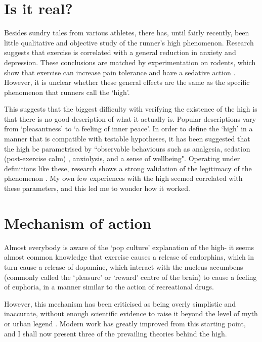 \documentclass[twocolumn]{article}
\begin{document}
\section{Is it real?}

	Besides sundry tales from various athletes, there has, until fairly recently, been little qualitative and objective study of the runner's high phenomenon. Research suggests \citep{mood, mood2} that exercise is correlated with a general reduction in anxiety and depression. These conclusions are matched by experimentation on rodents, which show that exercise can increase pain tolerance and have a sedative action \citep{endocan,ratrun}. However, it is unclear whether these general effects are the same as the specific phenomenon that runners call the `high'.
	
	This suggests that the biggest difficulty with verifying the existence of the high is that there is no good description of what it actually is. Popular descriptions vary from `pleasantness' to `a feeling of inner peace'. In order to define the `high' in a manner that is compatible with testable hypotheses, it has been suggested \citep{endocan} that the high be parametrised by ``observable behaviours such as analgesia, sedation (post-exercise calm) , anxiolysis, and a sense of wellbeing". Operating under definitions like these, research shows a strong validation of the legitimacy of the phenomenon \citep{endocan, opioid}. My own few experiences with the high seemed correlated with these parameters, and this led me to wonder how it worked.
	
\section{Mechanism of action}
	Almost everybody is aware of the `pop culture' explanation of the high- it seems almost common knowledge that exercise causes a release of endorphins, which in turn cause a release of dopamine, which interact with the nucleus accumbens (commonly called the `pleasure' or `reward' centre of the brain) to cause a feeling of euphoria, in a manner similar to the action of recreational drugs.
	
	However, this mechanism has been criticised as being overly simplistic and inaccurate, without enough scientific evidence to raise it beyond the level of myth or urban legend \citep{fiction}. Modern work has greatly improved from this starting point, and I shall now present three of the prevailing theories behind the high.
	
\end{document}
